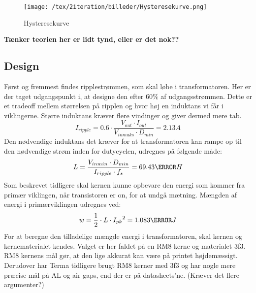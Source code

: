 \begin{figure}[H]
	\center
	\texttt{[image: /tex/2iteration/billeder/Hysteresekurve.png]}
	\caption{Hysteresekurve}
	\label{fig: Hysteresekurve}
\end{figure}
\textbf{Tænker teorien her er lidt tynd, eller er det nok??}

\subsection{Design}
Først og fremmest findes ripplestrømmen, som skal løbe i transformatoren. Her er der taget udgangspunkt i, at designe den efter $60\percent$ af udgangsstrømmen. Dette er et tradeoff mellem størrelsen på ripplen og hvor høj en induktans vi får i viklingerne. Større induktans kræver flere vindinger og giver dermed mere tab.
\begin{equation}
I_{ripple} = 0.6 \cdot \frac{V_{out} \cdot I_{out}}{V_{inmaks} \cdot   D_{min}} = 2.13A
\end{equation}
Den nødvendige induktans det kræver for at transformatoren kan rampe op til den nødvendige strøm inden for dutycyclen, udregnes på følgende måde:
\begin{equation}
L = \frac{V_{inmin} \cdot D_{min}}{I_{ripple} \cdot f_s} = 69.43\micro H
\end{equation}
Som beskrevet tidligere skal kernen kunne opbevare den energi som kommer fra primær viklingen, når transistoren er on, for at undgå mætning. Mængden af energi i primærviklingen udregnes ved:
\begin{equation} \label{Primary_energy}
w = \frac{1} {2} \cdot L \cdot {I_{pk}}^2 = 1.083\milli J
\end{equation}
For at beregne den tilladelige mængde energi i transformatoren, skal kernen og kernematerialet kendes. Valget er her faldet på en RM8 kerne og materialet 3f3. RM8 kernens mål gør, at den lige akkurat kan være på printet højdemæssigt. Derudover har Terma tidligere brugt RM8 kerner med 3f3 og har nogle mere præcise mål på AL og air gaps, end der er på datasheets’ne. (Kræver det flere argumenter?)



